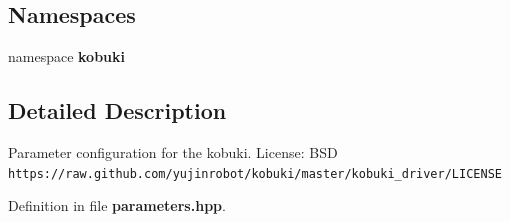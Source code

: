 \subsection*{\-Namespaces}
\begin{DoxyCompactItemize}
\item 
namespace {\bf kobuki}
\end{DoxyCompactItemize}


\subsection{\-Detailed \-Description}
\-Parameter configuration for the kobuki. \-License\-: \-B\-S\-D {\tt https\-://raw.\-github.\-com/yujinrobot/kobuki/master/kobuki\-\_\-driver/\-L\-I\-C\-E\-N\-S\-E} 

\-Definition in file {\bf parameters.\-hpp}.

